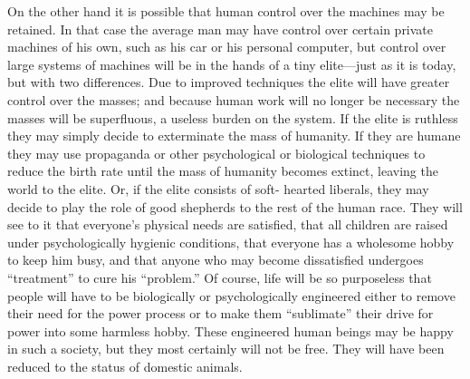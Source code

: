  On the other hand it is possible that human control over the machines may be retained. In that case the average man may have control over certain private machines of his own, such as his car or his personal computer, but control over large systems of machines will be in the hands of a tiny elite—just as it is today, but with two differences. Due to improved techniques the elite will have greater control over the masses; and because human work will no longer be necessary the masses will be superfluous, a useless burden on the system. If the elite is ruthless they may simply decide to exterminate the mass of humanity. If they are humane they may use propaganda or other psychological or biological techniques to reduce the birth rate until the mass of humanity becomes extinct, leaving the world to the elite. Or, if the elite consists of soft- hearted liberals, they may decide to play the role of good shepherds to the rest of the human race. They will see to it that everyone’s physical needs are satisfied, that all children are raised under psychologically hygienic conditions, that everyone has a wholesome hobby to keep him busy, and that anyone who may become dissatisfied undergoes “treatment” to cure his “problem.” Of course, life will be so purposeless that people will have to be biologically or psychologically engineered either to remove their need for the power process or to make them “sublimate” their drive for power into some harmless hobby. These engineered human beings may be happy in such a society, but they most certainly will not be free. They will have been reduced to the status of domestic animals.

